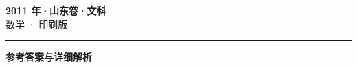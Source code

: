 \documentclass[zihao=5, a4paper]{ctexart}
\begin{document}
\begin{center}
  {\Large\bfseries 2011 年·山东卷·文科}\\[4pt]
  {\large 数学 · 印刷版}
\end{center}
\medskip
{}

\par\bigskip\hrule\bigskip
{}
\begin{center}{\large\bfseries 参考答案与详细解析}\end{center}
\smallskip

\end{document}

